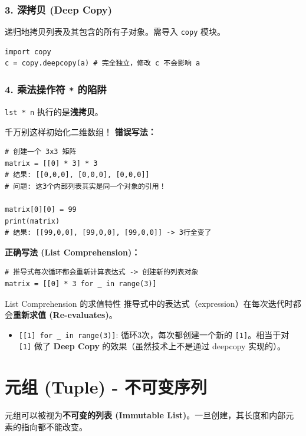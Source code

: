 \documentclass[12pt, a4paper]{article}
\begin{document}
\subsubsection{3. 深拷贝 (Deep Copy)}
递归地拷贝列表及其包含的所有子对象。需导入 \texttt{copy} 模块。
\begin{lstlisting}
import copy
c = copy.deepcopy(a) # 完全独立，修改 c 不会影响 a
\end{lstlisting}

\subsubsection{4. 乘法操作符 \texttt{*} 的陷阱}
\texttt{lst * n} 执行的是\textbf{浅拷贝}。

\begin{trapbox}{千万别这样初始化二维数组！}
\textbf{错误写法：}
\begin{lstlisting}
# 创建一个 3x3 矩阵
matrix = [[0] * 3] * 3 
# 结果: [[0,0,0], [0,0,0], [0,0,0]]
# 问题: 这3个内部列表其实是同一个对象的引用！

matrix[0][0] = 99
print(matrix)
# 结果: [[99,0,0], [99,0,0], [99,0,0]] -> 3行全变了
\end{lstlisting}

\textbf{正确写法 (List Comprehension)：}
\begin{lstlisting}
# 推导式每次循环都会重新计算表达式 -> 创建新的列表对象
matrix = [[0] * 3 for _ in range(3)] 
\end{lstlisting}
\end{trapbox}

\begin{importantbox}{List Comprehension 的求值特性}
推导式中的表达式（expression）在每次迭代时都会\textbf{重新求值 (Re-evaluates)}。
\begin{itemize}
    \item \texttt{[[1] for \_ in range(3)]}: 循环3次，每次都创建一个新的 \texttt{[1]}。相当于对 \texttt{[1]} 做了 \textbf{Deep Copy} 的效果（虽然技术上不是通过 deepcopy 实现的）。
\end{itemize}
\end{importantbox}

\section{元组 (Tuple) - 不可变序列}

元组可以被视为\textbf{不可变的列表 (Immutable List)}。一旦创建，其长度和内部元素的指向都不能改变。
\end{document}
